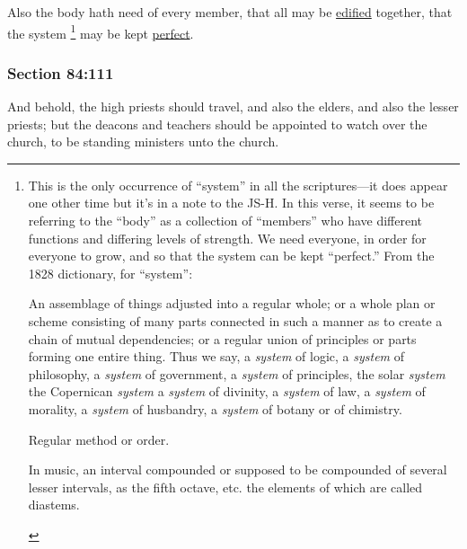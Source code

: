 		Also the body hath need of every member, that all may be \hyperref[EDIFICATION]{edified} together, that the system%
			\footnote{%
				This is the only occurrence of ``system'' in all the scriptures---it does appear one other time but it's in a note to the JS-H. In this verse, it seems to be referring to the ``body'' as a collection of ``members'' who have different functions and differing levels of strength. We need everyone, in order for everyone to grow, and so that the system can be kept ``perfect.''
				From the 1828 dictionary, for ``system'':
					\begin{compactitem}
						\item[1] An assemblage of things adjusted into a regular whole; or a whole plan or scheme consisting of many parts connected in such a manner as to create a chain of mutual dependencies; or a regular union of principles or parts forming one entire thing. Thus we say, a \textit{system} of logic, a \textit{system} of philosophy, a \textit{system} of government, a \textit{system} of principles, the solar \textit{system} the Copernican \textit{system} a \textit{system} of divinity, a \textit{system} of law, a \textit{system} of morality, a \textit{system} of husbandry, a \textit{system} of botany or of chimistry.
						\item[2] Regular method or order.
						\item[3] In music, an interval compounded or supposed to be compounded of several lesser intervals, as the fifth octave, etc. the elements of which are called diastems.
					\end{compactitem}
				}
		may be kept \hyperref[PERFECTION]{perfect}.


	\subsubsection{Section 84:111} %
		\label{DC84-111}

		And behold, the high priests should travel, and also the elders, and also the lesser priests; but the deacons and teachers should be appointed to watch over the church, to be standing ministers unto the church.

